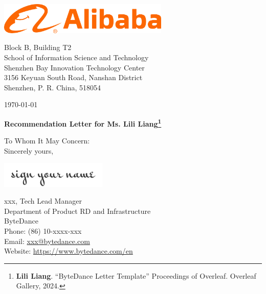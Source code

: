 \documentclass[12pt, a4paper]{letter} %
\begin{document}
    \begin{minipage}{0.5\textwidth}
        \vspace{0.3in} %
        \includegraphics[width=3.2in]{pic/Alibaba_Logo.png}\\ %
    \end{minipage}
    \hfill
    \begin{minipage}{0.6\textwidth}\raggedright
        \vspace{0.3in} %
        \small{
            \hphantom{AA}Block B, Building T2\\ %
            \hphantom{AA}School of Information Science and Technology\\
            \hphantom{AA}Shenzhen Bay Innovation Technology Center\\
            \hphantom{AA}3156 Keyuan South Road, Nanshan District\\
            \hphantom{AA}Shenzhen, P. R. China, 518054
        }
    \end{minipage}

    \vspace{0.4in} %

    \today

    \textbf{Recommendation Letter for Ms. Lili Liang\footnote{\textbf{Lili Liang}. ``ByteDance Letter Template'' Proceedings of Overleaf. Overleaf Gallery, 2024.}}

    To Whom It May Concern:\\


    Sincerely yours,

    \includegraphics[width=2in]{pic/signature.png} %

    xxx, Tech Lead Manager\\
    Department of Product RD and Infrastructure\\
    ByteDance\\
    Phone: (86) 10-xxxx-xxx\\ 
    Email: \href{mailto:xxx@nenu.edu.cn}{xxx@bytedance.com}\\
    Website: \url{https://www.bytedance.com/en}\\
\end{document}
